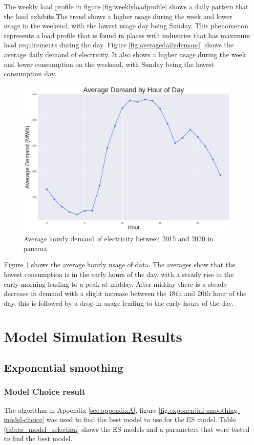   
The weekly load profile in figure \ref{fig:weeklyloadprofile} shows a daily pattern that the load exhibits.The trend shows a higher usage during the week and lower usage in the weekend, with the lowest usage day being Sunday. This phenomenon represents a load profile that is found in places with industries that has maximum load requirements during the day. Figure \ref{fig:averagedailydemand} shows the average daily demand  of electricity. It also shows a higher usage during the week and lower consumption on the weekend, with Sunday being the lowest consumption day. 
  \begin{figure}[h]
  	\centering
  	\includegraphics[width=0.45\linewidth]{Chapters/images/results/average_hourly_demand}
  	\caption{Average hourly demand of electricity between 2015 and 2020 in panama}
  	\label{fig:averagehourlydemand}
  \end{figure}
  
  Figure \ref{fig:averagehourlydemand} shows the average hourly usage of data. The averages show that the lowest consumption is in the early hours of the day, with a steady rise in the early morning leading to a peak at midday. After midday there is a steady decrease in demand with a slight increase between the 18th and 20th hour of the day, this is followed by a drop in usage leading to the early hours of the day.  


\section{Model Simulation Results}

\subsection{Exponential smoothing}
\subsubsection{Model Choice result}
The algorithm in Appendix \ref{sec:appendixA}, figure \ref{fig:exponential-smoothing-model-choice} was used to find the best model to use for the ES model. Table \ref{tab:es_model_selection} shows the ES models and a parameters that were tested to find the best model.

